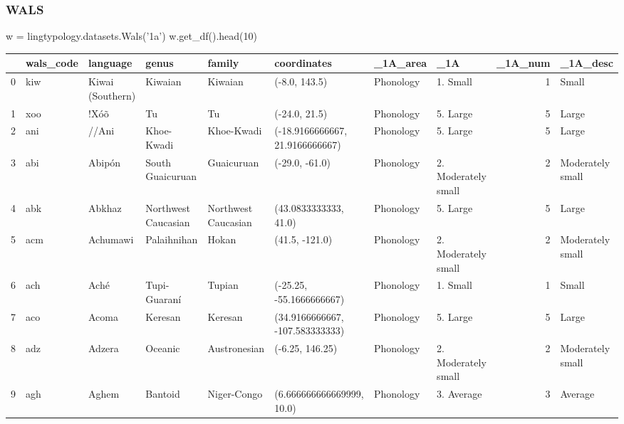 \documentclass{beamer}
\begin{document}
\begin{frame}[fragile]
\frametitle{WALS}
\begin{python}
w = lingtypology.datasets.Wals('1a')
w.get_df().head(10)
\end{python}
\begin{adjustbox}{max width=\textwidth}
\begin{tabular}{llllllllrl}
\toprule
{} & wals\_code &           language &                genus &               family &                      coordinates &   \_1A\_area &                  \_1A &  \_1A\_num &          \_1A\_desc \\
\midrule
0 &       kiw &   Kiwai (Southern) &              Kiwaian &              Kiwaian &                    (-8.0, 143.5) &  Phonology &             1. Small &        1 &             Small \\
1 &       xoo &               !Xóõ &                   Tu &                   Tu &                    (-24.0, 21.5) &  Phonology &             5. Large &        5 &             Large \\
2 &       ani &              //Ani &           Khoe-Kwadi &           Khoe-Kwadi &  (-18.9166666667, 21.9166666667) &  Phonology &             5. Large &        5 &             Large \\
3 &       abi &             Abipón &     South Guaicuruan &           Guaicuruan &                   (-29.0, -61.0) &  Phonology &  2. Moderately small &        2 &  Moderately small \\
4 &       abk &             Abkhaz &  Northwest Caucasian &  Northwest Caucasian &            (43.0833333333, 41.0) &  Phonology &             5. Large &        5 &             Large \\
5 &       acm &           Achumawi &          Palaihnihan &                Hokan &                   (41.5, -121.0) &  Phonology &  2. Moderately small &        2 &  Moderately small \\
6 &       ach &               Aché &         Tupi-Guaraní &               Tupian &         (-25.25, -55.1666666667) &  Phonology &             1. Small &        1 &             Small \\
7 &       aco &              Acoma &              Keresan &              Keresan &  (34.9166666667, -107.583333333) &  Phonology &             5. Large &        5 &             Large \\
8 &       adz &             Adzera &              Oceanic &         Austronesian &                  (-6.25, 146.25) &  Phonology &  2. Moderately small &        2 &  Moderately small \\
9 &       agh &              Aghem &              Bantoid &          Niger-Congo &        (6.666666666669999, 10.0) &  Phonology &           3. Average &        3 &           Average \\
\bottomrule
\end{tabular}
\end{adjustbox}
\end{frame}
\end{document}
